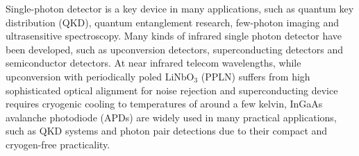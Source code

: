 \documentclass[%
 reprint,
superscriptaddress,
 amsmath,amssymb,
 aps,
]{revtex4-1}
\begin{document}
Single-photon detector is a key device in many applications, such as quantum key distribution (QKD)\cite{Lo-qkd2014,Guang-Zhao2016Time-bin,Tang2016plug-and-play}, quantum entanglement research\cite{Gregor-time-bin-dot-2014,Yin-Pan-Satellite-2017}, few-photon imaging\cite{Zhou2015Few-photon-imaging} and ultrasensitive spectroscopy\cite{Warburton2007Subcentimeter}. Many kinds of infrared single photon detector have been developed, such as upconversion detectors\cite{HPan-Upconversion2006}, superconducting detectors\cite{Marsili-superconducting2013,Lita-superconducting2002,Chandra2012Superconducting,Zhang2017-NbN-superconducting} and semiconductor detectors. At near infrared telecom wavelengths, while upconversion with periodically poled LiNbO$_{3}$ (PPLN) suffers from high sophisticated optical alignment for noise rejection\cite{Marius-Upconversion2004} and superconducting device requires cryogenic cooling to temperatures of around a few kelvin\cite{Marsili-superconducting2013}, InGaAs avalanche photodiode (APDs) are widely used in many practical applications, such as QKD systems\cite{Rubenok-qkd2013} and photon pair detections\cite{TGunthner-brw2015} due to their compact and cryogen-free practicality.
\end{document}
